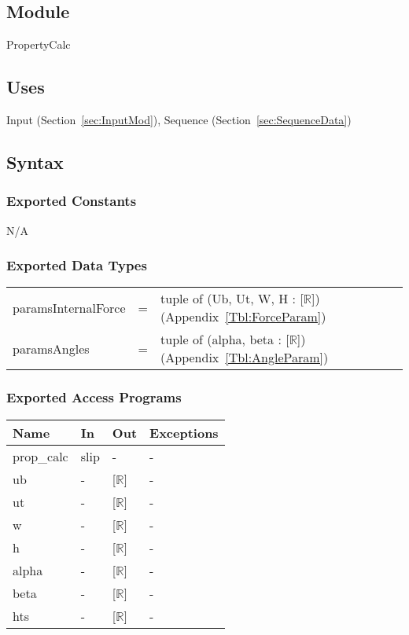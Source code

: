 \documentclass[12pt, titlepage]{article}
\begin{document}
\subsection{Module} 
PropertyCalc

\subsection{Uses}
Input (Section~\ref{sec:InputMod}), Sequence (Section~\ref{sec:SequenceData})

\subsection{Syntax}

\subsubsection{Exported Constants}
N/A

\subsubsection{Exported Data Types}
\renewcommand*{\arraystretch}{1.5}
\begin{longtable}{p{} c p{}}
	paramsInternalForce &=& tuple of (Ub, Ut, W, H : [$\mathbb{R}$]) 
	(Appendix~\ref{Tbl:ForceParam})\\
	paramsAngles &=& tuple of (alpha, beta : [$\mathbb{R}$]) 
	(Appendix~\ref{Tbl:AngleParam}) \\
\end{longtable}

\subsubsection{Exported Access Programs}

\begin{center}
	\renewcommand*{\arraystretch}{1.5}
	\begin{tabular} {p{}  p{}  p{} 
			p{} } \hline 
		\textbf{Name} & \textbf{In} & \textbf{Out} & \textbf{Exceptions} \\ 
		\hline

  prop\_calc & slip & - & - \\ 
  ub & - & [$\mathbb{R}$] & - \\
  ut & - & [$\mathbb{R}$] & - \\
  w & - & [$\mathbb{R}$] & - \\
  h & - & [$\mathbb{R}$] & - \\
  alpha & - & [$\mathbb{R}$] & - \\
  beta & - & [$\mathbb{R}$] & - \\
  hts & - & [$\mathbb{R}$] & - \\ \hline
\end{tabular}
\end{center}
\end{document}
